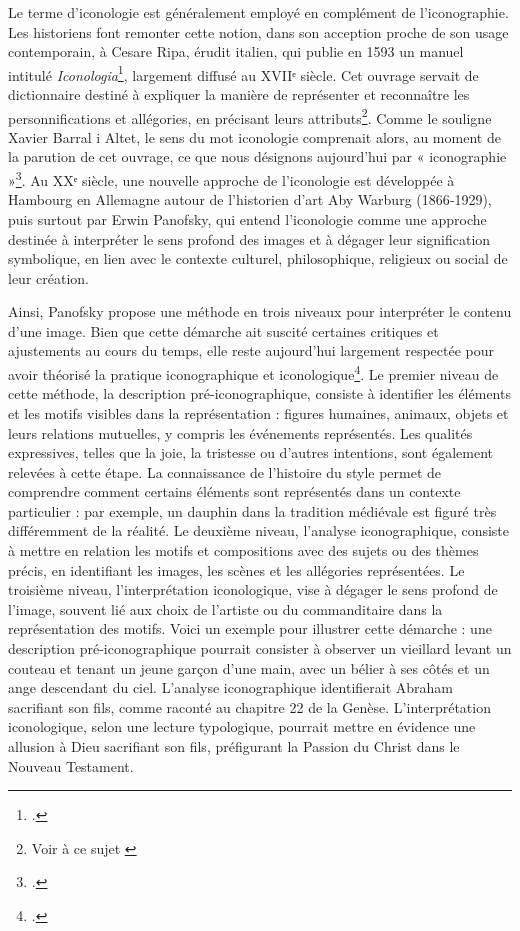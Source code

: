 Le terme d’iconologie est généralement employé en complément de l’iconographie. Les historiens font remonter cette notion, dans son acception proche de son usage contemporain, à Cesare Ripa, érudit italien, qui publie en 1593 un manuel intitulé \textit{Iconologia}\footcite{ripaIconologia1593}, largement diffusé au XVIIᵉ siècle. Cet ouvrage servait de dictionnaire destiné à expliquer la manière de représenter et reconnaître les personnifications et allégories, en précisant leurs attributs\footnote{Voir à ce sujet \cite{okayamaRipaIndexPersonifications1992}}. Comme le souligne Xavier Barral i Altet, le sens du mot iconologie comprenait alors, au moment de la parution de cet ouvrage, ce que nous désignons aujourd’hui par « iconographie »\footcite[p. 24]{barralialtetIntroduction2003}. Au XXᵉ siècle, une nouvelle approche de l’iconologie est développée à Hambourg en Allemagne autour de l’historien d’art Aby Warburg (1866‑1929), puis surtout par Erwin Panofsky, qui entend l’iconologie comme une approche destinée à interpréter le sens profond des images et à dégager leur signification symbolique, en lien avec le contexte culturel, philosophique, religieux ou social de leur création.

Ainsi, Panofsky propose une méthode en trois niveaux pour interpréter le contenu d’une image. Bien que cette démarche ait suscité certaines critiques et ajustements au cours du temps, elle reste aujourd’hui largement respectée pour avoir théorisé la pratique iconographique et iconologique\footcite[en particulier le premier chapitre «What is Iconography?», p. 3-25]{vanstratenIntroductionIconography1994}. Le premier niveau de cette méthode, la description pré-iconographique, consiste à identifier les éléments et les motifs visibles dans la représentation : figures humaines, animaux, objets et leurs relations mutuelles, y compris les événements représentés. Les qualités expressives, telles que la joie, la tristesse ou d’autres intentions, sont également relevées à cette étape. La connaissance de l’histoire du style permet de comprendre comment certains éléments sont représentés dans un contexte particulier : par exemple, un dauphin dans la tradition médiévale est figuré très différemment de la réalité. Le deuxième niveau, l’analyse iconographique, consiste à mettre en relation les motifs et compositions avec des sujets ou des thèmes précis, en identifiant les images, les scènes et les allégories représentées. Le troisième niveau, l’interprétation iconologique, vise à dégager le sens profond de l’image, souvent lié aux choix de l’artiste ou du commanditaire dans la représentation des motifs. Voici un exemple pour illustrer cette démarche : une description pré-iconographique pourrait consister à observer un vieillard levant un couteau et tenant un jeune garçon d’une main, avec un bélier à ses côtés et un ange descendant du ciel. L’analyse iconographique identifierait Abraham sacrifiant son fils, comme raconté au chapitre 22 de la Genèse. L’interprétation iconologique, selon une lecture typologique, pourrait mettre en évidence une allusion à Dieu sacrifiant son fils, préfigurant la Passion du Christ dans le Nouveau Testament. 

